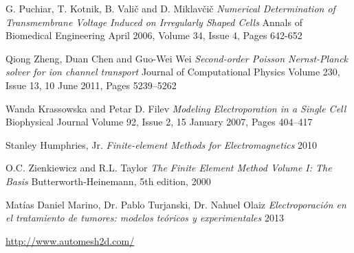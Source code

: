 \documentclass[11pt, twocolumn]{article}
\begin{document}
\begin{thebibliography}{9}

	G. Puchiar, T. Kotnik, B. Valič and D. Miklavčič
	\emph{Numerical Determination of Transmembrane Voltage Induced on Irregularly Shaped Cells}
	Annals of Biomedical Engineering
	April 2006, Volume 34, Issue 4, Pages 642-652

	Qiong Zheng, Duan Chen and Guo-Wei Wei
	\emph{Second-order Poisson Nernst-Planck solver for ion channel transport}
	Journal of Computational Physics
	Volume 230, Issue 13, 10 June 2011, Pages 5239–5262

	Wanda Krassowska and Petar D. Filev
	\emph{Modeling Electroporation in a Single Cell}
	Biophysical Journal
	Volume 92, Issue 2, 15 January 2007, Pages 404–417

	Stanley Humphries, Jr.
	\emph{Finite-element Methods for Electromagnetics}
	2010

	O.C. Zienkiewicz and R.L. Taylor
	\emph{The Finite Element Method Volume I: The Basis}
	Butterworth-Heinemann,
	5th edition,
	2000

	Matías Daniel Marino, Dr. Pablo Turjanski, Dr. Nahuel Olaiz
	\emph{Electroporación en el tratamiento de tumores: modelos teóricos y experimentales}
	2013

	\href{http://www.automesh2d.com/}{http://www.automesh2d.com/}

\end{thebibliography}
\end{document}
